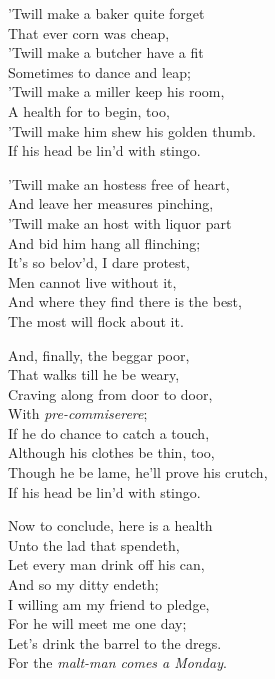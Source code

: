 \begin{dcverse}
\begin{altverse}
’Twill make a baker quite forget\\
That ever corn was cheap,\\
’Twill make a butcher have a fit\\
Sometimes to dance and leap;\\
’Twill make a miller keep his room,\\
A health for to begin, too,\\
’Twill make him shew his golden thumb.\\
If his head be lin’d with stingo.
\end{altverse}

\begin{altverse}
’Twill make an hostess free of heart,\\
And leave her measures pinching,\\
’Twill make an host with liquor part\\
And bid him hang all flinching;\\
It’s so belov’d, I dare protest,\\
Men cannot live without it,\\
And where they find there is the best,\\
The most will flock about it.
\end{altverse}
\end{dcverse}
\pagebreak

\settowidth{\versewidth}{Though he be lame, he’ll prove his crutch,}
\begin{dcverse}\begin{altverse}
And, finally, the beggar poor,\\
That walks till he be weary,\\
Craving along from door to door,\\
With \textit{pre-commiserere};\\
If he do chance to catch a touch,\\
Although his clothes be thin, too,\\
Though he be lame, he’ll prove his crutch,\\
If his head be lin’d with stingo.
\end{altverse}

\begin{altverse}
Now to conclude, here is a health\\
Unto the lad that spendeth,\\
Let every man drink off his can,\\
And so my ditty endeth;\\
I willing am my friend to pledge,\\
For he will meet me one day;\\
Let’s drink the barrel to the dregs.\\
For the \textit{malt-man comes a Monday}.
\end{altverse}
\end{dcverse}


